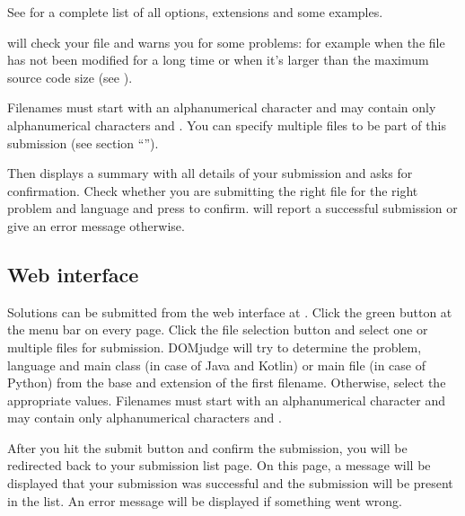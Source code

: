 \documentclass[a4paper,10pt,english,openany]{sphinxmanual}
\begin{document}
\sphinxAtStartPar
See  for a complete list of all options,
extensions and some examples.

\sphinxAtStartPar
{} will check your file and warns you for some problems:
for example when the file has not been modified for a long time or
when it’s larger than the maximum source code size
(see {\hyperref[\detokenize{team:runlimits}]{}}).

\sphinxAtStartPar
Filenames must start with an alphanumerical character and may contain only
alphanumerical characters and . You can specify multiple files
to be part of this submission (see section
“{\hyperref[\detokenize{team:judgingprocess}]{}}”).

\sphinxAtStartPar
Then  displays a summary with all details of your
submission and asks for confirmation. Check whether you are submitting
the right file for the right problem and language and press  to
confirm.  will report a successful submission or give
an error message otherwise.


\subsection{Web interface}
\label{\detokenize{team:web-interface}}
\sphinxAtStartPar
Solutions can be submitted from the web interface at .
Click the green  button at the menu bar on every page.
Click the file selection button and select one or
multiple files for submission. DOMjudge will try to determine the
problem, language and main class (in case of Java and Kotlin) or main file
(in case of Python) from the base and extension of the first filename.
Otherwise, select the appropriate values.
Filenames must start with an alphanumerical character and may contain only
alphanumerical characters and .

\sphinxAtStartPar
After you hit the submit button and confirm the submission, you will
be redirected back to your submission list page. On this page, a message
will be displayed that your submission was successful and the
submission will be present in the list. An error message will be
displayed if something went wrong.
\end{document}
